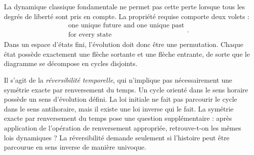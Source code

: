La dynamique classique fondamentale ne permet pas cette perte lorsque tous les degrés de liberté sont pris en compte. La propriété requise comporte deux volets :
\begin{equation}
  \boxed{\begin{gathered}
    \text{one unique future and one unique past}\\
    \text{for every state}
  \end{gathered}.}
  \label{eq:l01-reversibility}
\end{equation}
Dans un espace d’états fini, l’évolution doit donc être une permutation. Chaque état possède exactement une flèche sortante et une flèche entrante, de sorte que le diagramme se décompose en cycles disjoints.

\begin{classroomqa}
\end{classroomqa}

Il s’agit de la \emph{réversibilité temporelle}, qui n’implique pas nécessairement une symétrie exacte par renversement du temps. Un cycle orienté dans le sens horaire possède un sens d’évolution défini. La loi initiale ne fait pas parcourir le cycle dans le sens antihoraire, mais il existe une loi inverse qui le fait. La symétrie exacte par renversement du temps pose une question supplémentaire : après application de l’opération de renversement appropriée, retrouve-t-on les mêmes lois dynamiques ? La réversibilité demande seulement si l’histoire peut être parcourue en sens inverse de manière univoque.

\begin{classroomqa}
\end{classroomqa}

